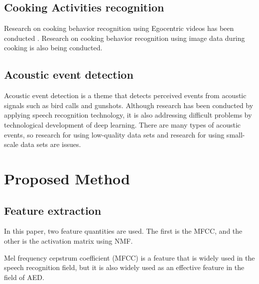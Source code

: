 \documentclass[sigchi]{acmart}
\begin{document}
\subsection{Cooking Activities recognition}

Research on cooking behavior recognition using Egocentric videos has been conducted \cite{Urabe2018}.
Research on cooking behavior recognition using image data during cooking is also being conducted.\cite{Kuehne2014}
\subsection{Acoustic event detection}

Acoustic event detection is a theme that detects perceived events from acoustic signals such as bird calls and gunshots.
Although research has been conducted by applying speech recognition technology, it is also addressing difficult problems by technological development of deep learning.
There are many types of acoustic events, so research for using low-quality data sets and research for using small-scale data sets are issues\cite{Imoto2018}.


\section{Proposed Method}
\subsection{Feature extraction}

In this paper, two feature quantities are used. The first is the MFCC, and the other is the activation matrix using NMF.

Mel frequency cepstrum coefficient (MFCC) is a feature that is widely used in the speech recognition field, but it is also widely used as an effective feature in the field of AED.
\end{document}
